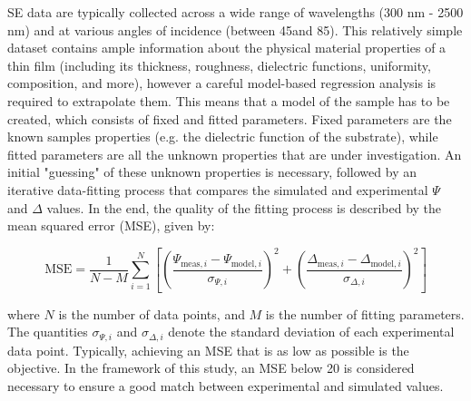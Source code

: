 SE data are typically collected across a wide range of wavelengths (300 nm - 2500 nm) and at various angles of incidence (between 45\degree and 85\degree). This relatively simple dataset contains ample information about the physical material properties of a thin film (including its thickness, roughness, dielectric functions, uniformity, composition, and more), however a careful model-based regression analysis is required to extrapolate them. This means that a model of the sample has to be created, which consists of fixed and fitted parameters. Fixed parameters are the known samples properties (e.g. the dielectric function of the substrate), while fitted parameters are all the unknown properties that are under investigation. An initial "guessing" of these unknown properties is necessary, followed by an iterative data-fitting process that compares the simulated and experimental $\Psi$ and $\Delta$ values. In the end, the quality of the fitting process is described by the mean squared error (MSE), given by: 


\begin{equation}
\text{MSE} = \frac{1}{N - M} \sum_{i=1}^{N} \left[ \left( \frac{\Psi_{\text{meas},i} - \Psi_{\text{model},i}}{\sigma_{\Psi,i}} \right)^2 + \left( \frac{\Delta_{\text{meas},i} - \Delta_{\text{model},i}}{\sigma_{\Delta,i}} \right)^2 \right]
\label{eq:mse}
\end{equation}

where \( N \) is the number of data points, and \( M \) is the number of fitting parameters. The quantities \( \sigma_{\Psi,i} \) and \( \sigma_{\Delta,i} \) denote the standard deviation of each experimental data point. Typically, achieving an MSE that is as low as possible is the objective. In the framework of this study, an MSE below 20 is considered necessary to ensure a good match between experimental and simulated values. 


